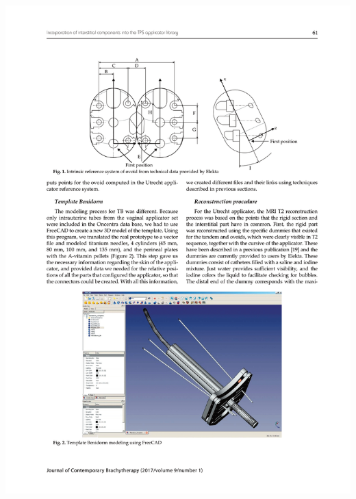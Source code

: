 \documentclass[
  a4paper,
]{scrreprt}
\begin{document}
\includegraphics{articulos/librerias/librerias-3.png}
\end{document}
